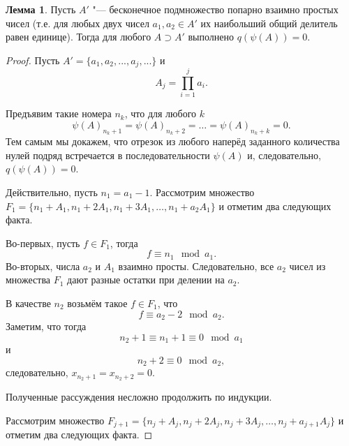 \documentclass[a4paper,openbib]{article}
\theoremstyle{definition}
\newtheorem{lemma}{Лемма}[section]
\begin{document}
\begin{lemma}
	\label{lem:ac0_primes_infinity_mutually_prime_subset}
	Пусть $A'$ "--- бесконечное подмножество попарно взаимно простых чисел
	(т.е. для любых двух чисел $a_1, a_2 \in A'$ их наибольший общий делитель равен единице).
	Тогда для любого $A \supset A' $ выполнено $q(\psi(A))=0$.
\end{lemma}
\begin{proof}
	Пусть $A' = \{ a_1, a_2, ..., a_j, ... \}$ и
	\begin{equation}
		\label{eq:ac0_primes_A_j_prod_des}
		A_j = \prod_{i=1}^j a_i
		.
	\end{equation}

	Предъявим такие номера $n_k$, что для любого $k$
	\begin{equation}
		\psi(A)_{n_k+1} = \psi(A)_{n_k+2} = \dots = \psi(A)_{n_k+k} = 0
		.
	\end{equation}
	Тем самым мы докажем, что отрезок из любого наперёд заданного количества нулей подряд
	встречается в последовательности $\psi(A)$ и, следовательно, $q(\psi(A)) = 0$.

	Действительно,
	пусть $n_1 = a_1 - 1$.
	Рассмотрим множество  $F_1 = \{ n_1 + A_1, n_1 + 2A_1, n_1 + 3A_1, \dots, n_1 + a_2A_1 \}$
	и отметим два следующих факта.

	Во-первых, пусть $f \in F_1$,
	тогда
	\begin{equation}
		f \equiv n_1 \mod a_1
		.
	\end{equation}
	Во-вторых, числа $a_2$ и $A_1$ взаимно просты.
	Следовательно, все $a_2$ чисел из множества $F_1$ дают разные остатки при делении на $a_2$.

	В качестве $n_2$ возьмём такое $f\in F_1$, что
	\begin{equation}
		f \equiv a_2 - 2 \mod a_2
		.
	\end{equation}
	Заметим, что тогда
	\begin{equation}
		n_2 + 1 \equiv n_1 + 1 \equiv 0 \mod a_1
	\end{equation}
	и
	\begin{equation}
		n_2 + 2 \equiv 0 \mod a_2
		,
	\end{equation}
	следовательно,
	$x_{n_2 + 1} = x_{n_2 + 2} = 0$.

	Полученные рассуждения несложно продолжить по индукции.

	Рассмотрим множество  $F_{j+1} = \{ n_j + A_j, n_j + 2A_j, n_j + 3A_j, \dots, n_j + a_{j+1}A_j \}$
	и отметим два следующих факта.


\end{proof}
\end{document}
